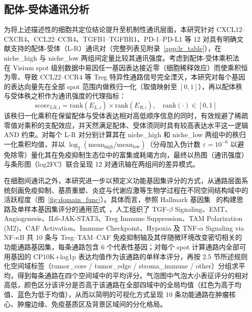 \documentclass[12pt, a4paper]{ctexart}
\begin{document}
\subsection{配体-受体通讯分析}

为将上述描述性的细胞共定位结论提升至机制性通讯层面，本研究针对 CXCL12--CXCR4、CCL22--CCR4、TGFB1--TGFBR1、PD-1--PD-L1 等 12 对具有明确文献支持的配体-受体（L-R）通讯对（完整列表见附录~\ref{app:lr_table}），在 niche\_high 与 niche\_low 两组间定量比较其通讯强度。考虑到配体-受体乘积法~\citep{efremova2020cellphonedb} 在 Visium spot 级别数据中易因任一基因表达接近零（细胞稀释效应）而使乘积恒为零、导致 CCL22--CCR4 等 Treg 特异性通路信号完全湮灭，本研究对每个基因的表达向量先在全部 spot 范围内做秩归一化（取值映射至 $[0,1]$），再以配体秩与受体秩之积作为通讯强度的代理指标：
\begin{equation*}
\text{score}_{LR,i} = \text{rank}(E_{L,i}) \times \text{rank}(E_{R,i}), \quad \text{rank}(\cdot) \in [0,1]
\end{equation*}
该秩归一化乘积在保留配体与受体表达相对高低顺序信息的同时，有效规避了稀疏零值对乘积的支配效应，并天然满足配体、受体须同时具有较高表达水平这一逻辑 AND 约束。对每个 L-R 对分别计算其在 niche\_high 和 niche\_low 两组中的秩归一化乘积均值，并以 $\log_2(\text{mean}_{\text{high}}/\text{mean}_{\text{low}})$（分母加入伪计数 $\varepsilon = 10^{-6}$ 以避免除零）量化其在免疫抑制生态位中的富集或耗竭方向，最终以热图（通讯强度）与条形图（log2FC）联合呈现 12 对通讯轴在两组间的差异模式。

在细胞间通讯之外，本研究进一步以预定义功能基因集评分的方式，从通路层面系统刻画免疫抑制、基质重塑、炎症与代谢应激等生物学过程在不同空间结构域中的活跃程度（图~\ref{fig:domain_func}）。具体而言，参照 Hallmark 基因集~\citep{liberzon2015molecular} 的构建思路及单样本基因集评分的通用范式~\citep{barbie2009systematic}，人工组织了 TGF-$\beta$ Signaling、EMT、Angiogenesis、IL6-JAK-STAT3、Treg Immune Suppression、TAM Polarization (M2)、CAF Activation、Immune Checkpoint、Hypoxia 及 TNF-$\alpha$ Signaling via NF-$\kappa$B 共 10 条与 Treg--TAM--CAF 免疫抑制轴及其伴随微环境改变密切相关的功能通路基因集，每条通路包含 6 个代表性基因；对每个 spot 计算通路内全部可用基因的 CP10K+log1p 表达均值作为该通路的单样本评分，再按 2.5 节所述规则化空间域标签（tumor\_core / tumor\_edge / stroma\_immune / other）分组求平均，得到每条通路在四个空间域中的平均评分。气泡图中气泡大小表征评分的相对高低，颜色区分该评分是否高于该通路在全部四域中的全局均值（红色为高于均值、蓝色为低于均值），从而以简明的可视化方式呈现 10 条功能通路在肿瘤核心、肿瘤边缘、免疫基质区及背景区域间的分化格局。
\end{document}
